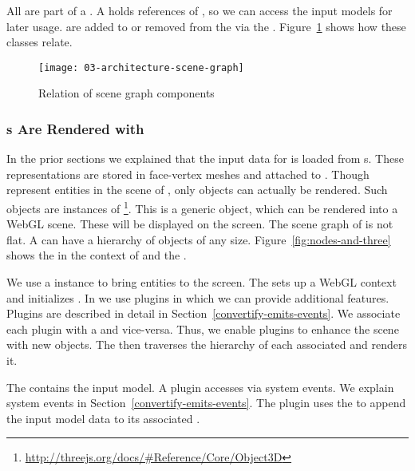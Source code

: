\documentclass[../../ClassicThesis.tex]{subfiles}
\begin{document}
All  are part of a . A
 holds references of , so we can
access the input models for later usage.  are
added to or removed from the  via the
. Figure~\ref{fig:scene-graph} shows how
these classes relate.

\begin{figure}[h]
  \centering
  \texttt{[image: 03-architecture-scene-graph]}
  \caption{Relation of scene graph components}
  \label{fig:scene-graph}
\end{figure}

\subsubsection{{\threedobject}s Are Rendered with
  {\threejs}}

In the prior sections we explained that the input data for
{\convertify} is loaded from {\stlfile}s. These
{\threedmodel} representations are stored in face-vertex
meshes and attached to .
Though  represent entities in the scene of
{\convertify}, only {\threejs} objects can actually be
rendered. Such {\threejs} objects are instances of
\footnote{\url{http://threejs.org/docs/\#Reference/Core/Object3D}}.
This is a generic object, which can be rendered into a WebGL
scene. These  will be displayed on the
screen. The scene graph of {\threejs} is not flat. A
 can have a hierarchy of objects of
any size. Figure~\ref{fig:nodes-and-three} shows the
 in the context of  and
the .

We use a  instance to bring {\threejs}
entities to the screen. The  sets up a WebGL
context and initializes {\threejs}. In {\convertify} we use
plugins in which we can provide additional features. Plugins
are described in detail in
Section~\ref{convertify-emits-events}. We associate each
plugin with a  and vice-versa. Thus,
we enable plugins to enhance the scene with new objects. The
 then traverses the hierarchy of each
associated  and renders it.

The  contains the input model. A plugin accesses
 via system events. We explain system events in
Section~\ref{convertify-emits-events}. The plugin uses the
 to append the input model data to its
associated .
\end{document}
